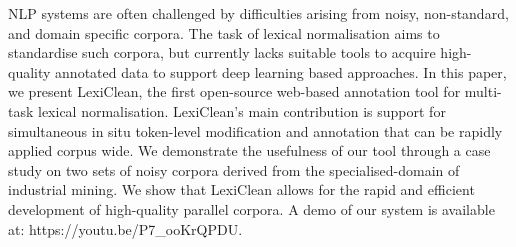 NLP systems are often challenged by difficulties arising from noisy, non-standard, and domain specific corpora. The task of lexical normalisation aims to standardise such corpora, but currently lacks suitable tools to acquire high-quality annotated data to support deep learning based approaches. In this paper, we present LexiClean, the first open-source web-based annotation tool for multi-task lexical normalisation. LexiClean's main contribution is support for simultaneous in situ token-level modification and annotation that can be rapidly applied corpus wide. We demonstrate the usefulness of our tool through a case study on two sets of noisy corpora derived from the specialised-domain of industrial mining. We show that LexiClean allows for the rapid and efficient development of high-quality parallel corpora. A demo of our system is available at: https://youtu.be/P7_ooKrQPDU.